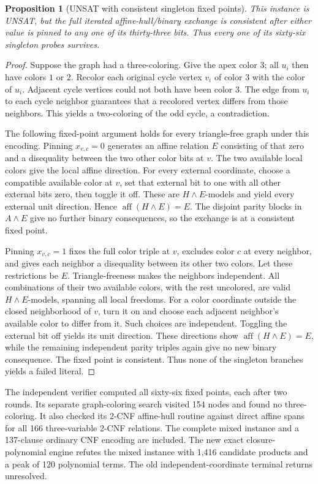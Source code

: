 \documentclass[11pt]{article}
\newtheorem{proposition}[theorem]{Proposition}
\newcommand{\aff}{\operatorname{aff}}
\begin{document}
\begin{proposition}[UNSAT with consistent singleton fixed points]
This instance is UNSAT, but the full iterated affine-hull/binary exchange
is consistent after either value is pinned to any one of its thirty-three
bits. Thus every one of its sixty-six singleton probes survives.
\end{proposition}
\begin{proof}
Suppose the graph had a three-coloring. Give the apex color \(3\);
all \(u_i\) then have colors \(1\) or \(2\).
Recolor each original cycle vertex \(v_i\) of color \(3\) with the color
of \(u_i\). Adjacent cycle vertices could not both have been color \(3\).
The edge from \(u_i\) to each cycle neighbor guarantees that a recolored
vertex differs from those neighbors. This yields a two-coloring of the
odd cycle, a contradiction.

The following fixed-point argument holds for every triangle-free graph
under this encoding. Pinning \(x_{v,c}=0\) generates an affine relation
\(E\) consisting of that zero and a disequality between the two other
color bits at \(v\). The two available local colors give the local
affine direction. For every external coordinate, choose a compatible
available color at \(v\), set that external bit to one with all other
external bits zero, then toggle it off. These are \(H\land E\)-models
and yield every external unit direction. Hence
\(\aff(H\land E)=E\).
The disjoint parity blocks in \(A\land E\) give no further binary
consequences, so the exchange is at a consistent fixed point.

Pinning \(x_{v,c}=1\) fixes the full color triple at \(v\), excludes color
\(c\) at every neighbor, and gives each neighbor a disequality between
its other two colors. Let these restrictions be \(E\).
Triangle-freeness makes the neighbors independent. All combinations
of their two available colors, with the rest uncolored, are valid
\(H\land E\)-models, spanning all local freedoms.
For a color coordinate outside the closed neighborhood of \(v\), turn it
on and choose each adjacent neighbor's available color to differ from
it. Such choices are independent. Toggling the external bit off yields
its unit direction. These directions show
\(\aff(H\land E)=E\), while the remaining independent parity triples
again give no new binary consequence. The fixed point is consistent.
Thus none of the singleton branches yields a failed literal.
\end{proof}

The independent verifier computed all sixty-six fixed points, each after
two rounds. Its separate graph-coloring search visited 154 nodes and
found no three-coloring. It also checked its 2-CNF affine-hull routine
against direct affine spans for all 166 three-variable 2-CNF relations.
The complete mixed instance and a 137-clause ordinary CNF encoding are
included. The new exact closure-polynomial engine refutes the mixed
instance with 1,416 candidate products and a peak of 120 polynomial
terms. The old independent-coordinate terminal returns unresolved.
\end{document}
